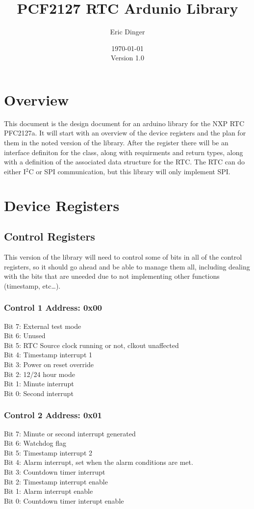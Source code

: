 \documentclass[letterpaper,11pt]{article}
\author{Eric Dinger}
\date{\today\\ Version 1.0}
\title{PCF2127 RTC Ardunio Library}
\newcommand{\IIC}
{I$^2$C }
\newcommand{\address}[1]
{\textbf{Address: 0x#1}}
\begin{document}
\maketitle

\section{Overview}
This document is the design document for an arduino library for the NXP RTC PFC2127a. It will start with an overview of the device registers and the plan for them in the noted version of the library. After the register there will be an interface definiton for the class, along with requirments and return types, along with a definition of the associated data structure for the RTC. The RTC can do either \IIC or SPI communication, but this library will only implement SPI.

\section{Device Registers}
	\subsection{Control Registers}
		This version of the library will need to control some of bits in all of the control registers, so it should go ahead and be able to manage them all, including dealing with the bits that are uneeded due to not implementing other functions (timestamp, etc\ldots).
		\subsubsection{Control 1 \address{00}}
			Bit 7: External test mode \\
			Bit 6: Unused \\
			Bit 5: RTC Source clock running or not, clkout unaffected\\
			Bit 4: Timestamp interrupt 1\\
			Bit 3: Power on reset override\\
			Bit 2: 12/24 hour mode\\
			Bit 1: Minute interrupt\\
			Bit 0: Second interrupt
		\subsubsection{Control 2 \address{01}}
			Bit 7: Minute or second interrupt generated\\
			Bit 6: Watchdog flag\\
			Bit 5: Timestamp interrupt 2\\
			Bit 4: Alarm interrupt, set when the alarm conditions are met.\\
			Bit 3: Countdown timer interrupt\\
			Bit 2: Timestamp interrupt enable\\
			Bit 1: Alarm interrupt enable\\
			Bit 0: Countdown timer interupt enable\\
\end{document}
